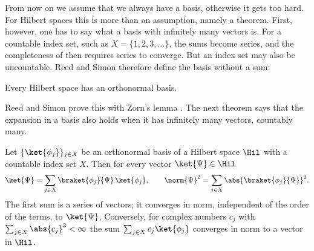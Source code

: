\begin{vertiefung}[id=c03.v4,
    titel={Bases with infinitely many vectors},
    wozu={The bases of $\elltwo$ and $\Ltwo{\mathbb{R}}$ in this block have infinitely many
      vectors, and the sums of the completeness relation become series. Here is how a basis is
      defined then, that there always is one and that the expansion in a basis with a countable
      index set holds, with a basis of $\elltwo$ and one of $\Ltwo{\mathbb{R}}$.},
    voraussetzung={Section~\ref{c03.s7} up to Proposition~\ref{c03.prop.entwicklung}; blocks~\ref{c03.v1}
      and~\ref{c03.v2}; the completeness of $\elltwo$ and
      $\Ltwo{\mathbb{R}}$ from Foundations~\ref{c03.f3}. The core up to
      Chapter~4 does not need this block.},
    zurueck={In infinite dimension, too, every Hilbert space has a basis. If its index set is
      countable, every vector is the sum of its components, as a series that converges in
      norm. In the core the finite sum suffices.}]
  From now on we assume that we always have a basis, otherwise it gets too hard. For Hilbert
  spaces this is more than an assumption, namely a theorem. First, however, one has to say
  what a basis with infinitely many vectors is. For a countable index set, such as
  $X = \{1, 2, 3, \dots\}$, the sums become series, and the completeness of  then
  requires series to converge. But an index set may also be uncountable. Reed and Simon
  therefore define the basis without a sum:


  \begin{theorem}\label{c03.thm.existenz}
    Every Hilbert space has an orthonormal basis.
  \end{theorem}

  Reed and Simon prove this with Zorn's lemma . The next
  theorem says that the expansion in a basis also holds when it has infinitely many vectors,
  countably many.

  \begin{theorem}\label{c03.thm.parseval}
    Let $\{\ket{\phi_j}\}_{j \in X}$ be an orthonormal basis of a Hilbert space $\Hil$ with a
    countable index set $X$. Then for every vector $\ket{\Psi} \in \Hil$
    \begin{equation}\label{c03.eq.parseval}
      \ket{\Psi} = \sum_{j \in X} \braket{\phi_j}{\Psi}\, \ket{\phi_j} ,
      \qquad
      \norm{\Psi}^2 = \sum_{j \in X} \abs{\braket{\phi_j}{\Psi}}^2 .
    \end{equation}
    The first sum is a series of vectors; it converges in norm, independent of the order of the
    terms, to $\ket{\Psi}$. Conversely, for complex numbers $c_j$ with
    $\sum_{j \in X} \abs{c_j}^2 < \infty$ the sum $\sum_{j \in X} c_j \ket{\phi_j}$ converges in
    norm to a vector in $\Hil$.
  \end{theorem}


\end{vertiefung}
